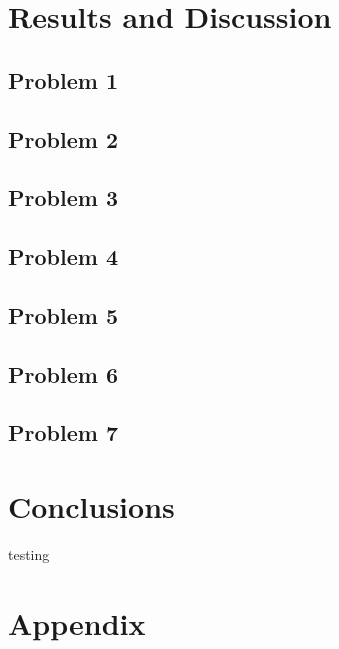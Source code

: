 \documentclass[a4paper]{article}
\begin{document}
\section{Results and Discussion} \label{Results}
\subsection{Problem 1}
\lipsum[1]
\subsection{Problem 2}
\lipsum[1]
\subsection{Problem 3}
\lipsum[1]
\subsection{Problem 4}
\lipsum[1]
\subsection{Problem 5}
\lipsum[1]
\subsection{Problem 6}
\lipsum[1]
\subsection{Problem 7}
\lipsum[1]

\section{Conclusions} \label{Conclusions}
testing \cite{book}

\section{Appendix}
\lipsum[1]




\end{document}

